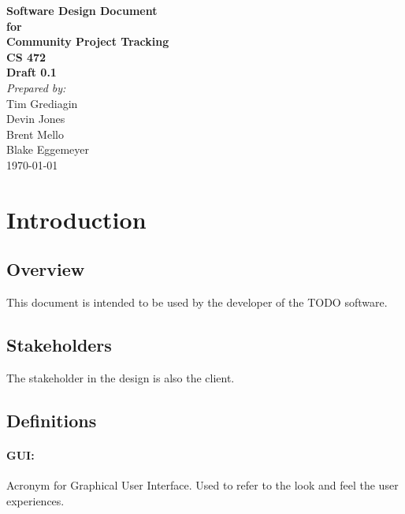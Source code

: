 \documentclass[12pt]{article}
\begin{document}
\begin{titlepage}
\begin{flushright} 
{\LARGE \bfseries Software Design Document}\\[1.2cm]
{\large \bfseries for}\\[1.2cm]
{\huge \bfseries Community Project Tracking}\\[1.2cm]
{\large \bfseries CS 472}\\
\vfill
{\large \bfseries Draft 0.1}\\[2cm]
\emph{Prepared by:} \\
Tim Grediagin\\
Devin Jones\\
Brent Mello\\
Blake Eggemeyer \\ [3cm]
{\large \today}
\\[2cm]
\end{flushright}
\end{titlepage}
\setcounter{tocdepth}{3}
\setcounter{secnumdepth}{5}
\tableofcontents
\newpage

\section{Introduction}

\subsection{Overview}
This document is intended to be used by the developer of the TODO software.

\subsection{Stakeholders}
The stakeholder in the design is also the client.

\subsection{Definitions}
\setcounter{paragraph}{0}
\setcounter{subsubsection}{0}
\paragraph{GUI:} Acronym for Graphical User Interface. Used to refer to the look and feel the user experiences.
\end{document}
